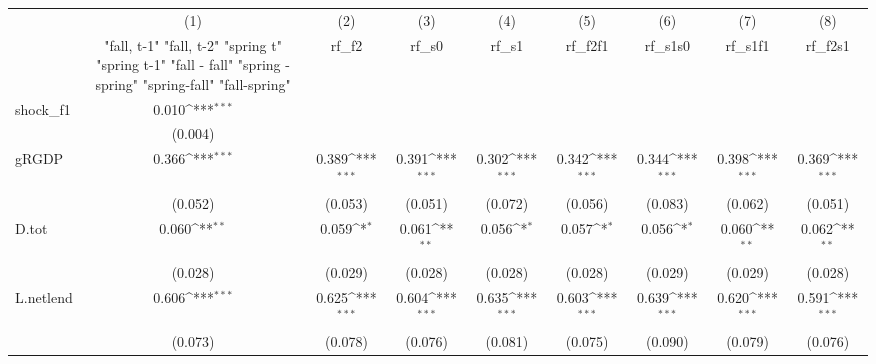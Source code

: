 {
\def\sym#1{\ifmmode^{#1}\else\(^{#1}\)\fi}
\begin{tabular}{l*{8}{c}}
\toprule
            &\multicolumn{1}{c}{(1)}&\multicolumn{1}{c}{(2)}&\multicolumn{1}{c}{(3)}&\multicolumn{1}{c}{(4)}&\multicolumn{1}{c}{(5)}&\multicolumn{1}{c}{(6)}&\multicolumn{1}{c}{(7)}&\multicolumn{1}{c}{(8)}\\
            &\multicolumn{1}{c}{  "fall, t-1" "fall, t-2" "spring t" "spring t-1"  "fall - fall" "spring - spring" "spring-fall" "fall-spring" }&\multicolumn{1}{c}{rf\_f2}&\multicolumn{1}{c}{rf\_s0}&\multicolumn{1}{c}{rf\_s1}&\multicolumn{1}{c}{rf\_f2f1}&\multicolumn{1}{c}{rf\_s1s0}&\multicolumn{1}{c}{rf\_s1f1}&\multicolumn{1}{c}{rf\_f2s1}\\
\midrule
shock\_f1    &       0.010\sym{***}&                     &                     &                     &                     &                     &                     &                     \\
            &     (0.004)         &                     &                     &                     &                     &                     &                     &                     \\
\addlinespace
gRGDP       &       0.366\sym{***}&       0.389\sym{***}&       0.391\sym{***}&       0.302\sym{***}&       0.342\sym{***}&       0.344\sym{***}&       0.398\sym{***}&       0.369\sym{***}\\
            &     (0.052)         &     (0.053)         &     (0.051)         &     (0.072)         &     (0.056)         &     (0.083)         &     (0.062)         &     (0.051)         \\
\addlinespace
D.tot       &       0.060\sym{**} &       0.059\sym{*}  &       0.061\sym{**} &       0.056\sym{*}  &       0.057\sym{*}  &       0.056\sym{*}  &       0.060\sym{**} &       0.062\sym{**} \\
            &     (0.028)         &     (0.029)         &     (0.028)         &     (0.028)         &     (0.028)         &     (0.029)         &     (0.029)         &     (0.028)         \\
\addlinespace
L.netlend   &       0.606\sym{***}&       0.625\sym{***}&       0.604\sym{***}&       0.635\sym{***}&       0.603\sym{***}&       0.639\sym{***}&       0.620\sym{***}&       0.591\sym{***}\\
            &     (0.073)         &     (0.078)         &     (0.076)         &     (0.081)         &     (0.075)         &     (0.090)         &     (0.079)         &     (0.076)         \\

\end{tabular}}
